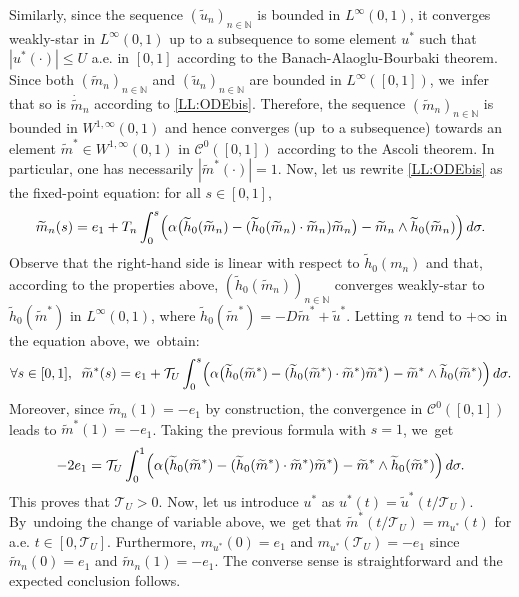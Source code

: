 \documentclass[10pt]{amsart}
\theoremstyle{definition}
\newcommand{\N} {\mathbb{N}}
\begin{document}
Similarly, since the sequence $(\widetilde u_n)_{n\in\N}$ is bounded in $L^\infty(0,1)$, it converges weakly-star in $L^\infty(0,1)$ up to a subsequence to some element $u^*$ such that $|u^*(\cdot)|\leq U $ a.e. in $[0,1]$ according to the Banach-Alaoglu-Bourbaki theorem. Since both $(\widetilde m_{n})_{n\in \N}$ and $(\widetilde u_n)_{n\in \N}$ are bounded in $L^\infty([0,1])$, we~infer that so is $\dot{\widetilde m}_{n}$ according to \eqref{LL:ODEbis}. Therefore, the sequence $(\widetilde m_{n})_{n\in \N}$ is bounded in $W^{1,\infty}(0,1)$ and hence converges (up~to a subsequence) towards an element $\widetilde{m}^*\in W^{1,\infty}(0,1)$ in $\mathcal{C}^0([0,1])$ according to the Ascoli theorem. In particular, one has necessarily $|\widetilde{m}^*(\cdot)|=1$. Now, let us rewrite \eqref{LL:ODEbis} as the fixed-point equation: for all $s\in [0,1]$,
\[
\widetilde m_{n}(s)=e_1+T_n\int_0^s\Bigl(\alpha \bigl(\widetilde h_0(\widetilde m_{n})-(\widetilde h_0(\widetilde m_{n})\cdot \widetilde m_{n}) \widetilde m_{n}\bigr)-\widetilde m_{n}\wedge \widetilde h_0(\widetilde m_{n})\Bigr)\, d\sigma .
\]
Observe that the right-hand side is linear with respect to $\widetilde h_0(m_{n})$ and that, according to the properties above, $(\widetilde h_0(\widetilde m_{n}))_{n\in \N}$ converges weakly-star to $\widetilde h_0(\widetilde m^*)$ in $L^\infty(0,1)$, where $\widetilde{h}_0(\widetilde{m}^*)=-D\widetilde{m}^*+\widetilde{u}^*$. Letting $n$ tend to $+\infty$ in the equation above, we~obtain:
\[
\forall s\in [0,1], \;\; \widetilde m^*(s)=e_1+\mathcal{T}_U\int_0^s\Bigl(\alpha \bigl(\widetilde h_0(\widetilde m^*)-(\widetilde h_0(\widetilde m^*)\cdot \widetilde m^*) \widetilde m^*\bigr)-\widetilde m^*\wedge \widetilde h_0(\widetilde m^*) \Bigr)\, d\sigma.
\]
Moreover, since $\tilde{m}_n (1) = - e_1$ by construction, the convergence in $\mathcal{C}^0 ([0, 1])$ leads to $\tilde{m}^* (1) = - e_1$. Taking the previous formula with $s=1$, we~get
\begin{equation*}
- 2 e_1 = \mathcal{T}_U\int_0^1\Bigl(\alpha \bigl(\widetilde h_0(\widetilde m^*)-(\widetilde h_0(\widetilde m^*)\cdot \widetilde m^*) \widetilde m^*\bigr)-\widetilde m^*\wedge \widetilde h_0(\widetilde m^*)\Bigr)\, d\sigma.
\end{equation*}
This proves that $\mathcal{T}_U > 0$.
Now, let us introduce $u^*$ as $u^*(t)=\widetilde{u}^*(t/\mathcal{T}_U)$. By~undoing the change of variable above, we~get that $\widetilde{m}^*(t/\mathcal{T}_U)=m_{u^*}(t)$ for a.e. $t\in [0,\mathcal{T}_U]$. Furthermore, $m_{u^*}(0)=e_1$ and $m_{u^*}(\mathcal{T}_U)=-e_1$ since $\widetilde{m}_n(0)=e_1$ and $\widetilde{m}_n(1)=-e_1$. The converse sense is straightforward and the expected conclusion follows.
\end{document}
